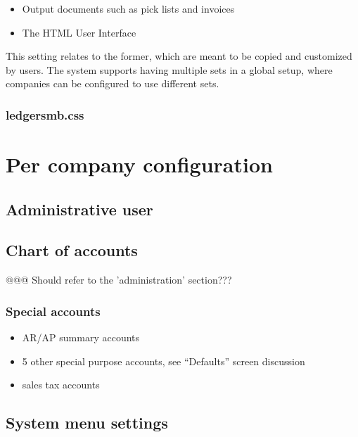 \begin{itemize}
\item Output documents such as pick lists and invoices
\item The HTML User Interface
\end{itemize}

This setting relates to the former, which are meant to be copied and customized by users. The system
supports having multiple sets in a global setup, where companies can be configured to use different
sets.




\subsection{ledgersmb.css}
\label{subsec-global-config-ledgersmb-css}



\chapter{Per company configuration}
\label{cha-company-config}

\section{Administrative user}
\label{sec-company-config-admin-user}

\section{Chart of accounts}
\label{sec-company-config-coa}

@@@ Should refer to the 'administration' section???

\subsection{Special accounts}
\label{subsec-company-config-coa-special-accounts}

\begin{itemize}
\item AR/AP summary accounts
\item 5 other special purpose accounts, see ``Defaults'' screen discussion
\item sales tax accounts
\end{itemize}


\section{System menu settings}
\label{sec-company-config-system-menu}

